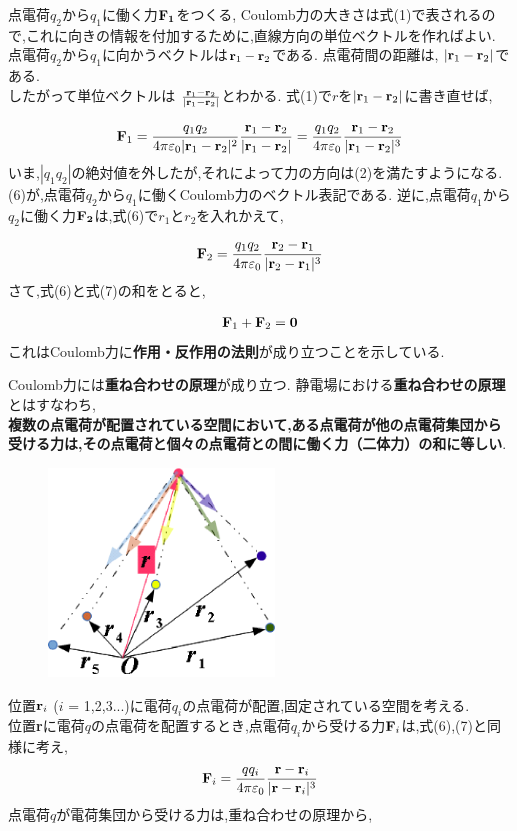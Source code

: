 \documentclass{jsarticle}
\begin{document}
点電荷$q_2$から$q_1$に働く力${\bf F_1}$をつくる,
Coulomb力の大きさは式(1)で表されるので,これに向きの情報を付加するために,直線方向の単位ベクトルを作ればよい.
点電荷$q_2$から$q_1$に向かうベクトルは${\bf r}_1-{\bf r}_2$である.
点電荷間の距離は, $|{\bf r}_1-{\bf r}_2|$である.\\
したがって単位ベクトルは
$\frac{{\bf r}_1-{\bf r}_2}{|{\bf r}_1-{\bf r}_2|}$とわかる.
式(1)で$r$を$|{\bf r}_1-{\bf r}_2|$に書き直せば,

\begin{eqnarray}
{\bf F}_1 =  \frac{q_{1}q_{2}}{4\pi \varepsilon_{0} |{\bf r}_1-{\bf r}_2|^2}\frac{{\bf r}_1-{\bf r}_2}{|{\bf r}_1-{\bf r}_2|} = \frac{q_{1}q_{2}}{4\pi \varepsilon_{0}}\frac{{\bf r}_1-{\bf r}_2}{|{\bf r}_1-{\bf r}_2|^3}
\end{eqnarray}
いま,$|q_1q_2|$の絶対値を外したが,それによって力の方向は(2)を満たすようになる.
(6)が,点電荷$q_2$から$q_1$に働くCoulomb力のベクトル表記である.
逆に,点電荷$q_1$から$q_2$に働く力${\bf F_2}$は,式(6)で$r_1$と$r_2$を入れかえて,

\begin{eqnarray}
{\bf F}_2 = \frac{q_{1}q_{2}}{4\pi \varepsilon_{0}}\frac{{\bf r}_2-{\bf r}_1}{|{\bf r}_2-{\bf r}_1|^3}
\end{eqnarray}
さて,式(6)と式(7)の和をとると,

\begin{eqnarray}
{\bf F}_{1}+{\bf F}_{2}={\bf 0}
\end{eqnarray}
これはCoulomb力に{\bf 作用・反作用の法則}が成り立つことを示している.

Coulomb力には{\bf 重ね合わせの原理}が成り立つ.
静電場における{\bf 重ね合わせの原理}とはすなわち,\\
{\bf 複数の点電荷が配置されている空間において,ある点電荷が他の点電荷集団から受ける力は,その点電荷と個々の点電荷との間に働く力（二体力）の和に等しい}.\\

\begin{figure}[htbp]
 \begin{center}
  \includegraphics[width=60mm]{1.3.eps}
 \end{center}
 \caption{}
 \label{fig:one}
\end{figure}
位置${\bf r}_{i}$ ($i$ = 1,2,3...)に電荷$q_i$の点電荷が配置,固定されている空間を考える.\\
位置{\bf r}に電荷$q$の点電荷を配置するとき,点電荷$q_i$から受ける力${\bf F}_i$は,式(6),(7)と同様に考え,
\begin{eqnarray}
{\bf F}_{i} = \frac{qq_{i}}{4\pi \varepsilon_{0}}\frac{{\bf r}-{\bf r}_i}{|{\bf r}-{\bf r}_i|^3}
\end{eqnarray}
点電荷$q$が電荷集団から受ける力は,重ね合わせの原理から,
\end{document}
